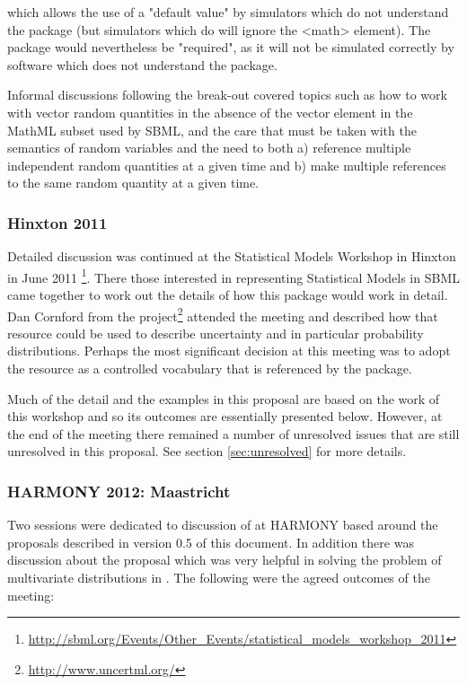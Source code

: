 \documentclass[draftspec]{sbmlpkgspec}
\begin{document}
which allows the use of a "default value" by simulators which do not
understand the package (but simulators which do will ignore the <math>
element). The package would nevertheless be "required", as it will not
be simulated correctly by software which does not understand the
package.

Informal discussions following the break-out covered topics such as
how to work with vector random quantities in the absence of the vector
element in the MathML subset used by SBML, and the care that must be
taken with the semantics of random variables and the need to both a)
reference multiple independent random quantities at a given time and
b) make multiple references to the same random quantity at a given
time.

\subsubsection{Hinxton 2011}

Detailed discussion was continued at the Statistical Models Workshop
in Hinxton in June 2011%
\footnote{\url{http://sbml.org/Events/Other_Events/statistical_models_workshop_2011}}. There
those interested in representing Statistical Models in SBML came
together to work out the details of how this package would work in
detail. Dan Cornford from the \uncertml
project\footnote{\url{http://www.uncertml.org/}} attended the meeting
and described how that resource could be used to describe uncertainty
and in particular probability distributions. Perhaps the most
significant decision at this meeting was to adopt the \uncertml
resource as a controlled vocabulary that is referenced by the \distrib package.

Much of the detail and the examples in this proposal are based on
the work of this workshop and so its outcomes are essentially
presented below. However, at the end of the meeting there remained a
number of unresolved issues that are still unresolved in this
proposal. See section \vref{sec:unresolved} for more details.


\subsubsection{HARMONY 2012: Maastricht}

Two sessions were dedicated to discussion of \distrib at HARMONY based
around the proposals described in version 0.5 of this document. In
addition there was discussion about the \arrays proposal which was
very helpful in solving the problem of multivariate distributions in
\distrib. The following were the agreed outcomes of the meeting:
\end{document}
